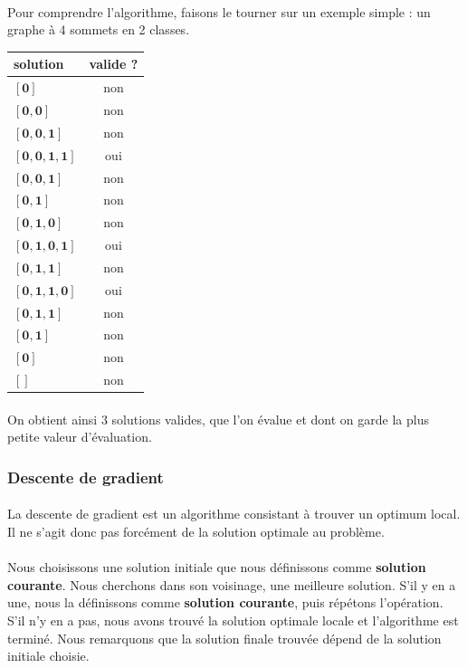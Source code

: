 \documentclass[12pt]{article}
\begin{document}
\paragraph{}Pour comprendre l'algorithme, faisons le tourner sur un exemple simple : un graphe à 4 sommets en 2 classes.

\begin{table}[h]
\centering
\begin{tabular}{|l|c|}
	\hline
	solution & valide ? \\
	\hline
	$\mathbf{[0]}$ & non \\
	$\mathbf{[0,0]}$ & non \\
	$\mathbf{[0,0,1]}$ & non \\
	$\mathbf{[0,0,1,1]}$ & oui \\
	$\mathbf{[0,0,1]}$ & non \\
	$\mathbf{[0,1]}$ & non \\
	$\mathbf{[0,1,0]}$ & non \\
	$\mathbf{[0,1,0,1]}$ & oui \\
	$\mathbf{[0,1,1]}$ & non \\
	$\mathbf{[0,1,1,0]}$ & oui \\
	$\mathbf{[0,1,1]}$ & non \\
	$\mathbf{[0,1]}$ & non \\
	$\mathbf{[0]}$ & non \\
	$\mathbf{[]}$ & non \\
	\hline
\end{tabular}
\end{table}

\paragraph{}On obtient ainsi 3 solutions valides, que l'on évalue et dont on garde la plus petite valeur d'évaluation.

\subsubsection{Descente de gradient}

\paragraph{}La descente de gradient est un algorithme consistant à trouver un optimum local. Il ne s'agit donc pas forcément de la solution optimale au problème.

\paragraph{}Nous choisissons une solution initiale que nous définissons comme \textbf{solution courante}. Nous cherchons dans son voisinage, une meilleure solution.
S'il y en a une, nous la définissons comme \textbf{solution courante}, puis répétons l'opération.
S'il n'y en a pas, nous avons trouvé la solution optimale locale et l'algorithme est terminé.
Nous remarquons que la solution finale trouvée dépend de la solution initiale choisie.
\end{document}
